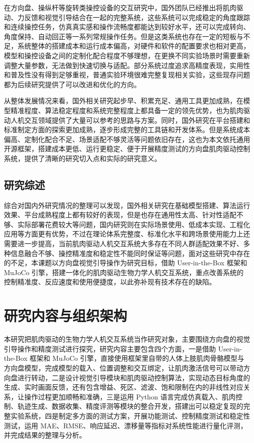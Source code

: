 在方向盘、操纵杆等旋转类操控设备的交互研究中，国外团队已经推出将肌肉驱动、力反馈和视觉引导结合在一起的完整系统，这些系统可以完成稳定的角度跟踪和连续操控任务，仿真真实感和操作流畅度都能达到较好水平，还可以完成转向、角度保持、自动回正等一系列常规操作任务\cite{liu2026actuation}。但是这类系统也存在一定的短板与不足，系统整体的搭建成本和运行成本偏高，对硬件和软件的配置要求也相对更高，模型和操控设备之间的定制化配合程度不够理想，在更换不同实验场景时需要重新调整大量参数，无法做到快速切换与适配。部分系统过度追求高精度表现，实用性和普及性没有得到足够重视，普通实验环境很难完整复现相关实验，这些现存问题都为后续研究提供了可以改进和优化的方向。

从整体发展情况来看，国外相关研究起步早、积累充足、通用工具更加成熟，在模型精准程度、算法稳定程度和系统完整程度上都具备一定的领先优势，也为肌肉驱动人机交互领域提供了大量可以参考的思路与方案。同时，国外研究在平台搭建和标准制定方面的探索更加成熟，逐步形成完整的工具链和开发体系。但是系统成本偏高、定制化配合不足、场景适配不够灵活等问题依旧存在，这也为本文依托通用开源框架，搭建成本更低、运行更稳定、便于开展精度测试的方向盘肌肉驱动控制系统，提供了清晰的研究切入点和实际的研究意义。
\subsection{研究综述}

综合对国内外研究情况的整理可以发现，国外相关研究在基础模型搭建、算法运行效果、平台成熟程度上都有较好的表现，但是也存在通用性太高、针对性适配不够、实际部署花费较大等问题，国内研究则在实际场景使用、低成本实现、工程化应用等方面更有优势，不过在理论体系完整度、标准化水平和跨场景使用能力上还需要进一步提高，当前肌肉驱动人机交互系统大多存在不同人群适配效果不好、多种信息融合不够、操控精准度和稳定性不能同时保证等问题，面对这些研究中存在的不足，本课题以方向盘视觉引导操作为研究目标，借助 User-in-the-Box 框架和 MuJoCo 引擎，搭建一体化的肌肉驱动生物力学人机交互系统，重点改善系统的控制精准度、反应速度和使用便捷度，以此弥补现有技术存在的缺陷。
\section{研究内容与组织架构}
本研究把肌肉驱动的生物力学人机交互系统当作研究对象，主要围绕方向盘的视觉引导操作和精度测试进行探究，研究内容主要包含四个方面，一是借助 User-in-the-Box 框架和 MuJoCo 引擎，直接使用框架里自带的人体上肢肌肉骨骼模型与方向盘模型，完成模型的载入、位置调整和交互绑定，让肌肉激活信号可以带动方向盘进行转动，二是设计视觉引导模块和肌肉驱动控制算法，实现动态目标角度的生成、实时画面反馈，还有包含增益、死区、滤波、饱和限制在内的非线性对应关系，让操作过程更加顺畅和准确，三是运用 Python 语言完成仿真载入、肌肉控制、轨迹生成、数据收集、精度评测等模块的整合开发，搭建出可以稳定复现的完整实验系统，四是制定多方面的测试方案，开展功能测试、控制精度测试和稳定性测试，运用 MAE、RMSE、响应延迟、漂移量等指标对系统性能进行量化评测，并完成结果的整理与分析。

